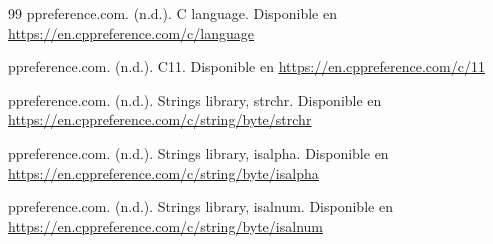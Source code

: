 \documentclass[12pt,letterpaper]{article}
\begin{document}
\begin{thebibliography}{99}
  ppreference.com. (n.d.). C language. Disponible en \textcolor{links}{\uline{\url{https://en.cppreference.com/c/language}}}

  ppreference.com. (n.d.). C11. Disponible en \textcolor{links}{\uline{\url{https://en.cppreference.com/c/11}}}

  ppreference.com. (n.d.). Strings library, strchr. Disponible en \textcolor{links}{\uline{\url{https://en.cppreference.com/c/string/byte/strchr}}}

  ppreference.com. (n.d.). Strings library, isalpha. Disponible en \textcolor{links}{\uline{\url{https://en.cppreference.com/c/string/byte/isalpha}}}

  ppreference.com. (n.d.). Strings library, isalnum. Disponible en \textcolor{links}{\uline{\url{https://en.cppreference.com/c/string/byte/isalnum}}}
    
\end{thebibliography}
\end{document}
